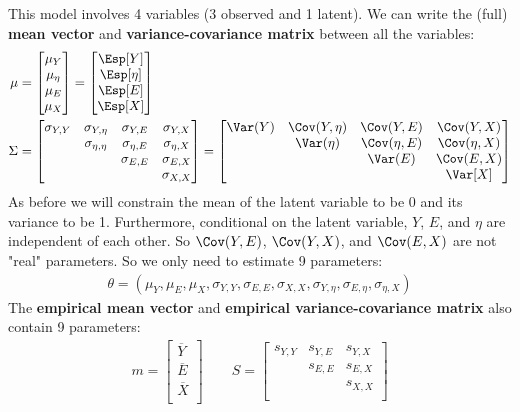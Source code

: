 \documentclass[12pt]{article}
\begin{document}
This model involves 4 variables (3 observed and 1 latent). We can
write the (full)  \textbf{mean vector} and \textbf{variance-covariance matrix} between all the variables:
\begin{align*}
\mu &= \begin{bmatrix} 
\mu_Y \\ \mu_\eta \\ \mu_E \\ \mu_{X} \\
\end{bmatrix} = \begin{bmatrix} 
\Esp[Y] \\ \Esp[\eta] \\ \Esp[E] \\ \Esp[X] \\
\end{bmatrix} 
\\
\Sigma &= \begin{bmatrix} 
\sigma_{Y,Y} & \sigma_{Y,\eta} & \sigma_{Y,E} & \sigma_{Y,X} \\ & \sigma_{\eta,\eta} & \sigma_{\eta,E} & \sigma_{\eta,X} \\ & & \sigma_{E,E} & \sigma_{E,X} \\ &&& \sigma_{X,X}  \\
\end{bmatrix} = \begin{bmatrix} 
\Var(Y) & \Cov(Y,\eta) & \Cov(Y,E) & \Cov(Y,X) \\ & \Var(\eta) & \Cov(\eta,E) & \Cov(\eta,X) \\ & & \Var(E) & \Cov(E,X)  \\ & & & \Var[X]\\
\end{bmatrix} 
\end{align*}
As before we will constrain the mean of the latent variable to be 0
and its variance to be 1. Furthermore, conditional on the latent
variable, \(Y\), \(E\), and \(\eta\) are independent of each other. So
\(\Cov(Y,E)\), \(\Cov(Y,X)\), and \(\Cov(E,X)\) are not "real"
parameters. So we only need to estimate 9 parameters:
\begin{align*}
\theta = \left( \mu_Y, \mu_E, \mu_X, \sigma_{Y,Y}, \sigma_{E,E}, \sigma_{X,X}, \sigma_{Y,\eta}, \sigma_{E,\eta}, \sigma_{\eta,X} \right)
\end{align*}
The \textbf{empirical mean vector} and \textbf{empirical variance-covariance matrix}
also contain 9 parameters:
\begin{align*}
m = \begin{bmatrix} 
\overline{Y} \\ \overline{E} \\ \overline{X} \\
\end{bmatrix} 
\qquad
S = \begin{bmatrix} 
s_{Y,Y} & s_{Y,E} & s_{Y,X} \\ & s_{E,E} & s_{E,X} \\ & & s_{X,X} \\
\end{bmatrix} 
\end{align*}
\end{document}
